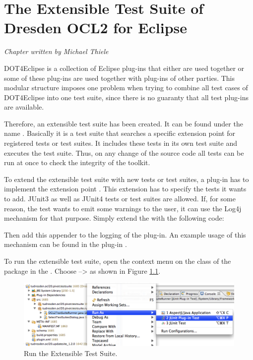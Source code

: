 \chapter{The Extensible Test Suite of Dresden OCL2 for Eclipse}
\label{chapter:generalTestSuite}

\begin{flushright}
\textit{Chapter written by Michael Thiele}
\end{flushright}

\acl{DOT4Eclipse} is a collection of Eclipse plug-ins that either are used together or some of these plug-ins are used together with plug-ins of other parties. This modular structure imposes one problem when trying to combine all test cases of \acl{DOT4Eclipse} into one test suite, since there is no guaranty that all test plug-ins are available.

Therefore, an extensible test suite has been created. It can be found under the name . Basically it is a test suite that searches a specific extension point for registered tests or test suites. It includes these tests in its own test suite and executes the test suite. Thus, on any change of the source code all tests can be run at once to check the integrity of the toolkit.

To extend the extensible test suite with new tests or test suites, a plug-in has to implement the extension point . This extension has to specify the tests it wants to add. JUnit3 as well as JUnit4 tests or test suites are allowed. If, for some reason, the test wants to emit some warnings to the user, it can use the Log4j mechanism for that purpose. Simply extend the  with the following code:


Then add this appender to the logging of the plug-in. An example usage of this mechanism can be found in the plug-in .

To run the extensible test suite, open the context menu on the class  of the package  in the . Choose  --\textgreater {} as shown in Figure \ref{pic:generalTestSuite:RunAs}.

\begin{figure}[!htbp]
	\centering
	\includegraphics[width=1.0\linewidth]{figures/generalTestSuite/RunAs}
	\caption{Run the Extensible Test Suite.}
	\label{pic:generalTestSuite:RunAs}
\end{figure}